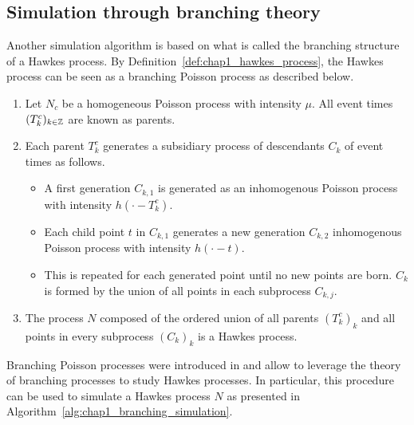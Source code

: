 \subsection{Simulation through branching theory}

Another simulation algorithm is based on what is called the branching structure of a Hawkes process.
By Definition~\ref{def:chap1_hawkes_process}, the Hawkes process can be seen as a branching Poisson process as described below.
\begin{enumerate}
    \item Let $N_c$ be a homogeneous Poisson process with intensity $\mu$. All event times $(T_k^c)_{k\in{\mathbb Z}}$ are known as parents.
    \item Each parent $T_k^c$ generates a subsidiary process of descendants $C_k$ of event times as follows.
    \begin{itemize}
        \item A first generation $C_{k,1}$ is generated as an inhomogenous Poisson process with intensity $h(\cdot - T_k^c)$.
        \item Each child point $t$ in $C_{k,1}$ generates a new generation $C_{k,2}$ inhomogenous Poisson process with intensity $h(\cdot - t)$.
        \item This is repeated for each generated point until no new points are born. 
        $C_k$ is formed by the union of all points in each subprocess $C_{k, j}$.
    \end{itemize}
    \item The process $N$ composed of the ordered union of all parents $(T_k^c)_k$ and all points in every subprocess $(C_k)_{k}$ is a Hawkes process.
\end{enumerate}
Branching Poisson processes were introduced in \textcite{Bartlett1963, Lewis1964} and allow to leverage the theory of branching processes to study Hawkes processes.
In particular, this procedure can be used to simulate a Hawkes process $N$ as presented in Algorithm~\ref{alg:chap1_branching_simulation}.

